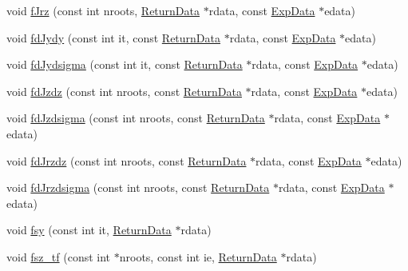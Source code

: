\begin{DoxyCompactItemize}
\item 
void \mbox{\hyperlink{classamici_1_1_model_a82a8b0d0b20ab474f48e98776b6cb791}{f\+Jrz}} (const int nroots, \mbox{\hyperlink{classamici_1_1_return_data}{Return\+Data}} $\ast$rdata, const \mbox{\hyperlink{classamici_1_1_exp_data}{Exp\+Data}} $\ast$edata)
\item 
void \mbox{\hyperlink{classamici_1_1_model_a182dd2b4c7ad2fcfdc1987e0dfb8d5a4}{fd\+Jydy}} (const int it, const \mbox{\hyperlink{classamici_1_1_return_data}{Return\+Data}} $\ast$rdata, const \mbox{\hyperlink{classamici_1_1_exp_data}{Exp\+Data}} $\ast$edata)
\item 
void \mbox{\hyperlink{classamici_1_1_model_aa683851edd9a578fda8e3f29465c313f}{fd\+Jydsigma}} (const int it, const \mbox{\hyperlink{classamici_1_1_return_data}{Return\+Data}} $\ast$rdata, const \mbox{\hyperlink{classamici_1_1_exp_data}{Exp\+Data}} $\ast$edata)
\item 
void \mbox{\hyperlink{classamici_1_1_model_a2506c3b5baa2f4de9236df5ca443c19a}{fd\+Jzdz}} (const int nroots, const \mbox{\hyperlink{classamici_1_1_return_data}{Return\+Data}} $\ast$rdata, const \mbox{\hyperlink{classamici_1_1_exp_data}{Exp\+Data}} $\ast$edata)
\item 
void \mbox{\hyperlink{classamici_1_1_model_ab4e0c14948c6af3b5c877f30f0100954}{fd\+Jzdsigma}} (const int nroots, const \mbox{\hyperlink{classamici_1_1_return_data}{Return\+Data}} $\ast$rdata, const \mbox{\hyperlink{classamici_1_1_exp_data}{Exp\+Data}} $\ast$edata)
\item 
void \mbox{\hyperlink{classamici_1_1_model_ac3f8bf431f374d77ba9190a460043009}{fd\+Jrzdz}} (const int nroots, const \mbox{\hyperlink{classamici_1_1_return_data}{Return\+Data}} $\ast$rdata, const \mbox{\hyperlink{classamici_1_1_exp_data}{Exp\+Data}} $\ast$edata)
\item 
void \mbox{\hyperlink{classamici_1_1_model_a3e6a11cdaa35b6e85d013eb9f63564d2}{fd\+Jrzdsigma}} (const int nroots, const \mbox{\hyperlink{classamici_1_1_return_data}{Return\+Data}} $\ast$rdata, const \mbox{\hyperlink{classamici_1_1_exp_data}{Exp\+Data}} $\ast$edata)
\item 
void \mbox{\hyperlink{classamici_1_1_model_a6b1c331013c5947e77129cb4da82713e}{fsy}} (const int it, \mbox{\hyperlink{classamici_1_1_return_data}{Return\+Data}} $\ast$rdata)
\item 
void \mbox{\hyperlink{classamici_1_1_model_a6c533c9b3476d81336d1758a817d0746}{fsz\+\_\+tf}} (const int $\ast$nroots, const int ie, \mbox{\hyperlink{classamici_1_1_return_data}{Return\+Data}} $\ast$rdata)

\end{DoxyCompactItemize}
